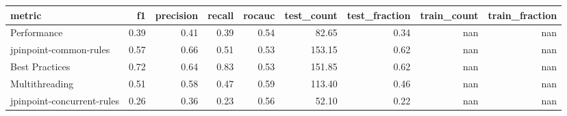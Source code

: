 \begin{tabular}{lrrrrrrrr}
\toprule
metric &   f1 &  precision &  recall &  rocauc &  test\_count &  test\_fraction &  train\_count &  train\_fraction \\
\midrule
Performance                & 0.39 &       0.41 &    0.39 &    0.54 &       82.65 &           0.34 &          nan &             nan \\
jpinpoint-common-rules     & 0.57 &       0.66 &    0.51 &    0.53 &      153.15 &           0.62 &          nan &             nan \\
Best Practices             & 0.72 &       0.64 &    0.83 &    0.53 &      151.85 &           0.62 &          nan &             nan \\
Multithreading             & 0.51 &       0.58 &    0.47 &    0.59 &      113.40 &           0.46 &          nan &             nan \\
jpinpoint-concurrent-rules & 0.26 &       0.36 &    0.23 &    0.56 &       52.10 &           0.22 &          nan &             nan \\
\bottomrule
\end{tabular}
